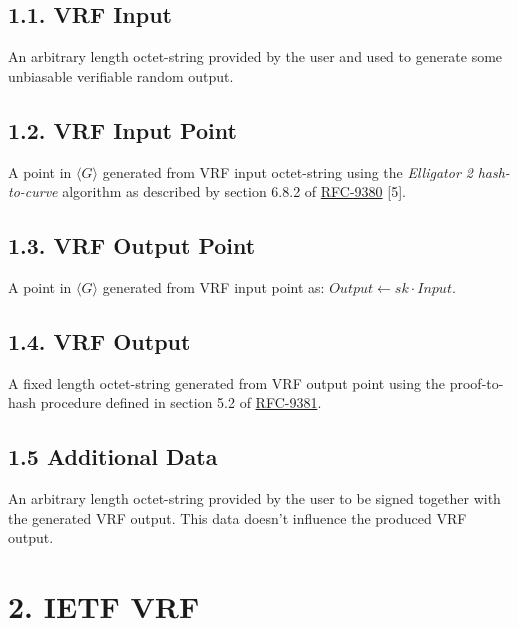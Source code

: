 \documentclass[
]{article}
\begin{document}
\hypertarget{vrf-input}{%
\subsection{1.1. VRF Input}\label{vrf-input}}

An arbitrary length octet-string provided by the user and used to
generate some unbiasable verifiable random output.

\hypertarget{vrf-input-point}{%
\subsection{1.2. VRF Input Point}\label{vrf-input-point}}

A point in \(\langle G \rangle\) generated from VRF input octet-string
using the \emph{Elligator 2} \emph{hash-to-curve} algorithm as described
by section 6.8.2 of
\href{https://datatracker.ietf.org/doc/rfc9380}{RFC-9380} {[}5{]}.

\hypertarget{vrf-output-point}{%
\subsection{1.3. VRF Output Point}\label{vrf-output-point}}

A point in \(\langle G \rangle\) generated from VRF input point as:
\(Output \leftarrow sk \cdot Input\).

\hypertarget{vrf-output}{%
\subsection{1.4. VRF Output}\label{vrf-output}}

A fixed length octet-string generated from VRF output point using the
proof-to-hash procedure defined in section 5.2 of
\href{https://datatracker.ietf.org/doc/rfc9381}{RFC-9381}.

\hypertarget{additional-data}{%
\subsection{1.5 Additional Data}\label{additional-data}}

An arbitrary length octet-string provided by the user to be signed
together with the generated VRF output. This data doesn't influence the
produced VRF output.

\hypertarget{ietf-vrf}{%
\section{2. IETF VRF}\label{ietf-vrf}}
\end{document}
